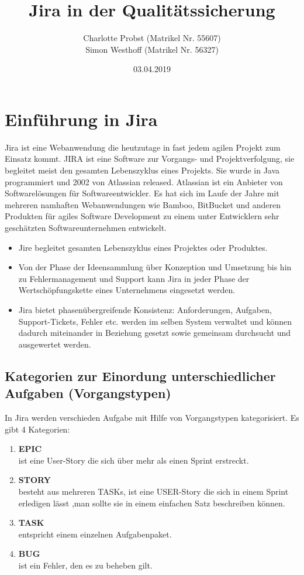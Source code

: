 \documentclass[a4paper, 10pt]{scrartcl}
\title{Jira in der Qualitätssicherung}
\author{Charlotte Probst (Matrikel Nr. 55607)\\
 Simon Westhoff (Matrikel Nr. 56327)}
\date{03.04.2019}
\begin{document}
\maketitle


\newpage

\tableofcontents

\newpage

\section{Einführung in Jira}
Jira ist eine Webanwendung die heutzutage in fast jedem agilen Projekt zum Einsatz kommt. JIRA ist eine Software zur Vorgangs- und Projektverfolgung, sie begleitet meist den gesamten Lebenszyklus eines Projekts. Sie wurde in Java programmiert und 2002 von Atlassian released. Atlassian ist ein Anbieter von Softwarelösungen für Softwareentwickler. Es hat sich im Laufe der Jahre mit mehreren namhaften Webanwendungen wie Bamboo, BitBucket und anderen Produkten für agiles Software Development zu einem unter Entwicklern sehr geschätzten Softwareunternehmen entwickelt.
\begin{itemize}
\item Jire begleitet gesamten Lebenszyklus eines Projektes oder Produktes.
\item Von der Phase der Ideensammlung über Konzeption und Umsetzung bis hin zu Fehlermanagement und Support kann Jira in jeder Phase der Wertschöpfungskette eines Unternehmens eingesetzt werden.
\item Jira bietet phasenübergreifende Konsistenz: Anforderungen, Aufgaben, Support-Tickets, Fehler etc. werden im selben System verwaltet und können dadurch miteinander in Beziehung gesetzt sowie gemeinsam durchsucht und ausgewertet werden.
\end{itemize}

\subsection{Kategorien zur Einordung unterschiedlicher Aufgaben (Vorgangstypen)}
In Jira werden verschieden Aufgabe mit Hilfe von Vorgangstypen kategorisiert. Es gibt 4 Kategorien:
\begin{enumerate}
\item \textbf{EPIC}\\
ist eine User-Story die sich über mehr als einen Sprint erstreckt.
\item \textbf{STORY}\\
besteht aus mehreren TASKs, ist eine USER-Story die sich in einem Sprint erledigen lässt ,man sollte sie in einem einfachen Satz beschreiben können.
\item \textbf{TASK}\\
entspricht einem einzelnen Aufgabenpaket.
\item \textbf{BUG}\\
ist ein Fehler, den es zu beheben gilt.
\end{enumerate}
\end{document}
